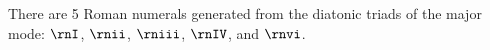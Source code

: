 
There are 5 Roman numerals generated from the diatonic
triads of the major mode: $\rnI$, $\rnii$, $\rniii$,
$\rnIV$, and $\rnvi$.
